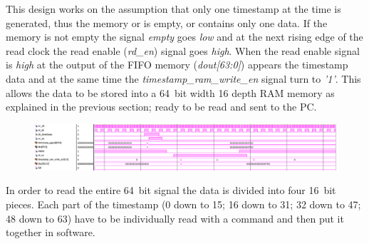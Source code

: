 This design works on the assumption that only one timestamp at the time is generated, thus the memory or is empty, or contains only one data.
If the memory is not empty the signal \textit{empty} goes \textit{low} and at the next rising edge of the read clock the read enable (\textit{rd\_en}) signal goes \textit{high}.
When the read enable signal is \textit{high} at the output of the FIFO memory (\textit{dout[63:0]}) appears the timestamp data and at the same time the \textit{timestamp\_ram\_write\_en} signal turn to \textit{'1'}.
This allows the data to be stored into a 64~bit width 16 depth RAM memory as explained in the previous section; ready to be read and sent to the PC.
\begin{figure}[H]
	\centering
	\includegraphics[width=1.0\linewidth]{IMG/ch4/TIMESTAMPsimulations/TIMESTAMPFIFO}
	\caption{}
	\label{fig:timestampfifo}
\end{figure}
\noindent In order to read the entire 64~bit signal the data is divided into four 16~bit pieces. Each part of the timestamp (0 down to 15; 16 down to 31; 32 down to 47; 48 down to 63) have to be individually read with a command and then put it together in software. 

